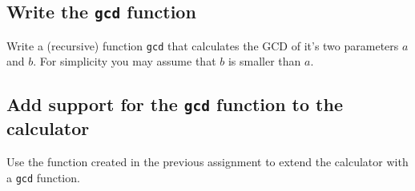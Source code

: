 \documentclass[12pt,a4paper,english,twoside]{article}
\begin{document}
\subsection{Write the \texttt{gcd} function}
Write a (recursive) function \texttt{gcd} that calculates the GCD of it's two 
parameters $a$ and $b$. For simplicity you may assume that $b$ is smaller than 
$a$.
\subsection{Add support for the \texttt{gcd} function to the calculator}
Use the function created in the previous assignment to extend the calculator 
with a \texttt{gcd} function.

\end{document}
